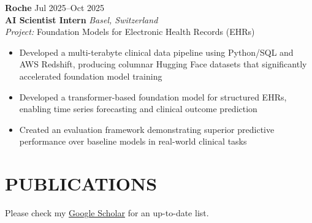 \documentclass[10pt, letterpaper]{article}
\let\hrefWithoutArrow\href %
\renewcommand{\href}[2]{\hrefWithoutArrow{#1}{\ifthenelse{\equal{#2}{}}{ }{#2 }\raisebox{.15ex}{\footnotesize \faExternalLink*}}}
\begin{document}
\textbf{Roche} \hfill Jul 2025--Oct 2025 \\
\textbf{AI Scientist Intern} \hfill \textit{Basel, Switzerland} \\
\textit{Project:} Foundation Models for Electronic Health Records (EHRs)

\begin{itemize}
    \itemsep -3pt {}
    \item Developed a multi-terabyte clinical data pipeline using Python/SQL and AWS Redshift, producing columnar Hugging Face datasets that significantly accelerated foundation model training
    \item Developed a transformer-based foundation model for structured EHRs, enabling time series forecasting and clinical outcome prediction
    \item Created an evaluation framework demonstrating superior predictive performance over baseline models in real-world clinical tasks
\end{itemize}


\section{PUBLICATIONS}

\newcommand{\publication}[4]{%
    \item
    \parbox[t]{0.72\linewidth}{\textit{#1}}%
    \hfill%
    \parbox[t]{0.25\linewidth}{\raggedleft\textbf{#2}}\\[2pt]
    #3 \hfill #4%
}
Please check my \hrefWithoutArrow{https://scholar.google.ca/citations?user=TcZu-VsAAAAJ&hl=en}{Google Scholar} for an up-to-date list.
\end{document}
